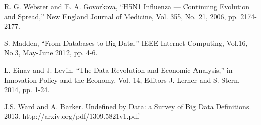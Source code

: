 \documentclass[10pt, conference, compsocconf]{IEEEtran}
\begin{document}
\begin{thebibliography}{00}
R. G. Webster and E. A. Govorkova, ``H5N1 Influenza — Continuing Evolution and Spread,'' New England Journal of Medicine, Vol. 355, No. 21, 2006, pp. 2174-2177.

S. Madden, ``From Databases to Big Data,'' IEEE Internet Computing, Vol.16, No.3, May-June 2012, pp. 4-6.

L. Einav and J. Levin, ``The Data Revolution and Economic Analysis,'' in Innovation Policy and the Economy, Vol. 14, Editors J. Lerner and S. Stern, 2014, pp. 1-24.

J.S. Ward and A. Barker. Undefined by Data: a Survey of Big Data Definitions. 2013. http://arxiv.org/pdf/1309.5821v1.pdf

\end{thebibliography}
\end{document}
